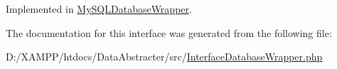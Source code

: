 Implemented in \hyperlink{class_david_fricker_1_1_data_abstracter_1_1_my_s_q_l_database_wrapper_a7fb294063cf3c7db8953cf241630d382}{My\+S\+Q\+L\+Database\+Wrapper}.



The documentation for this interface was generated from the following file\+:\begin{DoxyCompactItemize}
\item 
D\+:/\+X\+A\+M\+P\+P/htdocs/\+Data\+Abstracter/src/\hyperlink{_interface_database_wrapper_8php}{Interface\+Database\+Wrapper.\+php}\end{DoxyCompactItemize}
